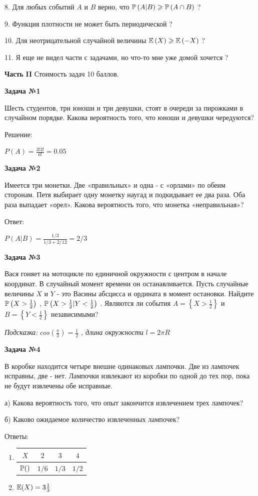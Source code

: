\documentclass[12pt, a4paper]{article}\usepackage[]{graphicx}\usepackage[]{color}
\begin{document}
	8. Для любых событий  $A$  и  $B$  верно, что  $\P\left(A|B\right)\ge \P\left(A\cap B\right)$  ?

	9. Функция плотности не может быть периодической ?

	10. Для неотрицательной случайной величины  $\E\left(X\right)\ge \E\left(-X\right)$  ?

	11. Я еще не видел части с задачами, но что-то мне уже домой хочется ?


	{\bf Часть }{\bf II} Стоимость задач 10 баллов.

	{\bf Задача №1}

	Шесть студентов, три юноши и три девушки, стоят в очереди за пирожками в случайном порядке. Какова вероятность того, что юноши и девушки чередуются?

	Решение:

	$P(A)=\frac{3!3!}{6!}=0.05$

	{\bf Задача №2}

	Имеется три монетки. Две «правильных» и одна - с «орлами» по обеим сторонам. Петя выбирает одну монетку наугад и подкидывает ее два раза. Оба раза выпадает «орел». Какова вероятность того, что монетка «неправильная»?

	Ответ:

	$P(A|B)=\frac{1/3}{1/3+2/12}=2/3$

	{\bf Задача №3}

	Вася гоняет на мотоцикле по единичной окружности с центром в начале координат. В случайный момент времени он останавливается. Пусть случайные величины  $X$  и  $Y$  - это Васины абсцисса и ордината в момент остановки. Найдите  $\P\left(X>\frac{1}{2} \right)$ ,  $\P\left(X>\frac{1}{2} |Y<\frac{1}{2} \right)$ . Являются ли события  $A=\left\{X>\frac{1}{2} \right\}$  и  $B=\left\{Y<\frac{1}{2} \right\}$  независимыми?

	{\it Подсказка: } $cos\left(\frac{\pi }{3} \right)=\frac{1}{2} $ {\it , длина окружности } $l=2\pi R$

	{\bf Задача №4}

	В коробке находится четыре внешне одинаковых лампочки. Две из лампочек исправны, две - нет. Лампочки извлекают из коробки по одной до тех пор, пока не будут извлечены обе исправные.

	а)	Какова вероятность того, что опыт закончится извлечением трех лампочек?

	б)	Каково ожидаемое количество извлеченных лампочек?

	Ответы:
	\begin{enumerate}
		\item
		\begin{tabular}{c|ccc}
			$X$ & $2$ & $3$ & $4$ \\
			\hline
			$\P()$ & $1/6$ & $1/3$ & $1/2$ \\
		\end{tabular}
		\item $\E(X)=3\frac{1}{3}$
	\end{enumerate}
\end{document}
